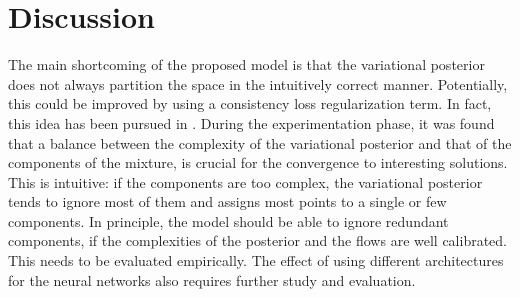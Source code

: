 \section{Discussion}

The main shortcoming of the proposed model is that the variational posterior does
not always partition the space in the intuitively correct manner. Potentially,
this could be improved by using a consistency loss regularization term. In fact,
this idea has been pursued in \autocite{semisuplearning_nflows}.
During the experimentation phase, it was found that a balance between the complexity of the variational
posterior and that of the components of the mixture, is crucial for the
convergence to interesting solutions. This is intuitive: if the components are
too complex, the variational posterior tends to ignore most of them and assigns
most points to a single or few components. In principle, the model should be
able to ignore redundant components, if the complexities of the posterior and the flows
are well calibrated. This needs to be evaluated empirically. The effect of using
different architectures for the neural networks also requires further study and
evaluation.
